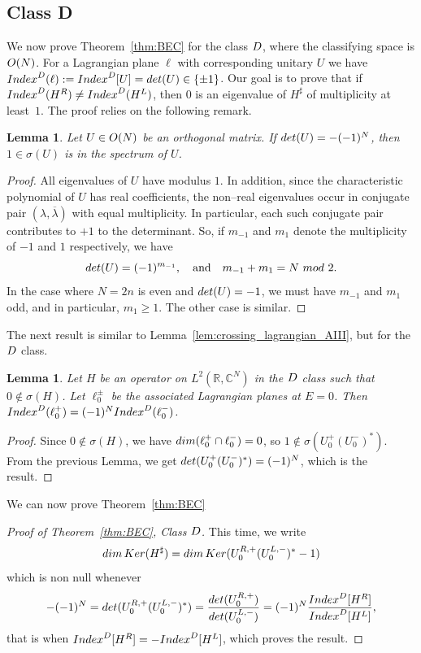 \documentclass[11pt]{amsart}
\numberwithin{equation}{section} %
\newtheorem{lemma}[theorem]{Lemma}
\newcommand\1{{\mathds 1}}
\def\C{{\mathbb C}}
\def\rD{{\rm D}}
\def\O{{\rm O}}
\def\Index{{\rm Index}}
\def\Ker{{\rm Ker }}
\def\dim{{\rm dim }}
\def\det{{\rm det}}
\begin{document}
\subsection{Class D} We now prove Theorem~\ref{thm:BEC} for the class $\rD$, where the classifying space is $\O(N)$. For a Lagrangian plane $\ell$ with corresponding unitary $U$ we have $\Index^\rD(\ell) := \Index^\rD[U]= \det(U) \in \{ \pm 1\}$. Our goal is to prove that if $\Index^\rD(H^R) \neq \Index^\rD(H^L)$, then $0$ is an eigenvalue of $H^\sharp$ of multiplicity at least~$1$. The proof relies on the following remark.

\begin{lemma} 
    Let $U \in \O(N)$ be an orthogonal matrix. If $\det(U) = -(-1)^N$, then $1 \in \sigma(U)$ is in the spectrum of $U$.
\end{lemma}
\begin{proof}
    All eigenvalues of $U$ have modulus $1$. In addition, since the characteristic polynomial of $U$ has real coefficients, the non--real eigenvalues occur in conjugate pair $(\lambda, \overline{\lambda})$ with equal multiplicity. In particular, each such conjugate pair contributes to $+1$ to the determinant. So, if $m_{-1}$ and $m_1$ denote the multiplicity of $-1$ and $1$ respectively, we have
    \[
        \det(U) = (-1)^{m_{-1}} , \quad \text{and} \quad m_{-1} + m_1 = N \ {\rm mod} \ 2.
    \]
    In the case where $N = 2n$ is even and $\det(U) = -1$, we must have $m_{-1}$ and $m_1$ odd, and in particular, $m_1 \ge 1$. The other case is similar.
\end{proof}

The next result is similar to Lemma~\ref{lem:crossing_lagrangian_AIII}, but for the $\rD$ class.
\begin{lemma}
	Let $H$ be an operator on $L^2(\mathbb R,\C^N)$ in the $\rD$ class such that  $0 \notin \sigma (H)$. Let $\ell_0^\pm$ be the associated Lagrangian planes at $E=0$. 
     Then $\Index^\rD(\ell_0^+) = (-1)^N \Index^\rD(\ell_0^-)$.
\end{lemma}

\begin{proof}
    Since $0 \notin \sigma(H)$, we have $\dim (\ell_0^+ \cap \ell_0^-) = 0$, so $1 \notin \sigma \left( U_0^{+} (U_0^-)^*\right)$. From the previous Lemma, we get $\det( U_0^{+} (U_0^-)^* ) = (-1)^N$, which is the result.
\end{proof}

We can now prove Theorem~\ref{thm:BEC}
\begin{proof}[Proof of Theorem~\ref{thm:BEC}, Class $\rD$] This time, we write
    \[
        \dim \, \Ker(H^\sharp)  = \dim \, \Ker ( U_0^{R, +} (U_0^{L, -})^* - 1  )
    \]
    which is non null whenever
    \[
        -(-1)^N = \det (U_0^{R, +} (U_0^{L, -})^*) = \frac{\det(U_0^{R,+})}{\det(U_0^{L,-})} = (-1)^N \frac{\Index^\rD[H^R]}{\Index^\rD[H^L]},
    \]
    that is when $\Index^\rD[H^R] = -\Index^\rD[H^L]$, which proves the result.
\end{proof}
\end{document}
